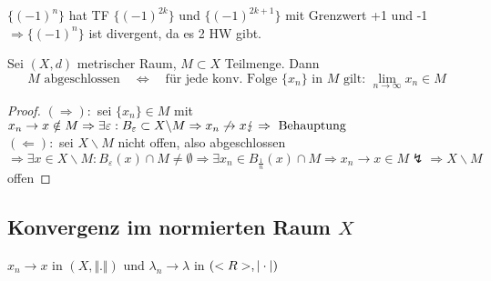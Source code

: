 \begin{example}
	$\{(-1)^n\}$ hat TF $\{(-1)^{2k}\}$ und $\{(-1)^{2k+1}\}$ mit Grenzwert +1 und -1 $\Rightarrow \{(-1)^n\}$ ist divergent, da es 2 HW gibt.
\end{example}

\begin{proposition}
	Sei $(X,d)$ metrischer Raum, $M\subset X$ Teilmenge. Dann
	\[ M\text{ abgeschlossen} \quad\Leftrightarrow\quad \text{für jede konv. Folge $\{x_n\}$ in $M$ gilt: }\lim\limits_{n\rightarrow\infty} x_n\in M \]
\end{proposition}
\begin{proof}
	$(\Rightarrow):$ sei $\{x_n\}\in M$ mit $x_n\to x\notin M\Rightarrow\exists\varepsilon:B_{\varepsilon}\subset X\backslash M\Rightarrow x_n\not\to x\lightning\Rightarrow \text{ Behauptung}$ \\
	$(\Leftarrow):$ sei $X\backslash M$ nicht offen, also abgeschlossen $\Rightarrow\exists x\in X\backslash M:B_{\varepsilon}(x)\cap M\neq\emptyset\Rightarrow\exists x_n\in B_{\frac{1}{n}}(x)\cap M\Rightarrow x_n\to x\in M\lightning\Rightarrow X\backslash M$ offen
\end{proof}

\subsection{Konvergenz im normierten Raum $X$}
$x_n\to x$ in $(X,\Vert .\Vert)$ und $\lambda_n\to\lambda$ in $(<R>,\vert\cdot\vert)$

